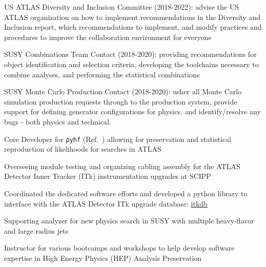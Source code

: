 \documentclass[margin,line]{resume}
\begin{document}
\begin{resume}
\begin{list2}
  \item US ATLAS Diversity and Inclusion Committee (2018-2022): advise the US ATLAS organization on how to implement recommendations in the Diversity and Inclusion report, which recommendations to implement, and modify practices and procedures to improve the collaboration environment for everyone
  \item SUSY Combinations Team Contact (2018-2020): providing recommendations for object identification and selection criteria, developing the toolchains necessary to combine analyses, and performing the statistical combinations
  \item SUSY Monte Carlo Production Contact (2018-2020): usher all Monte Carlo simulation production requests through to the production system, provide support for defining generator configurations for physics, and identify/resolve any bugs - both physics and technical.
  \item Core Developer for \texttt{pyhf} (Ref.~\cite{ATL-PHYS-PUB-2019-029}) allowing for preservation and statistical reproduction of likelihoods for searches in ATLAS
  \item Overseeing module testing and organizing cabling assembly for the ATLAS Detector Inner Tracker (ITk) instrumentation upgrades at SCIPP
  \item Coordinated the dedicated software efforts and developed a python library to interface with the ATLAS Detector ITk upgrade database: \href{https://pypi.org/project/itkdb/}{itkdb}
  \item Supporting analyzer for new physics search in SUSY with multiple heavy-flavor and large radius jets \cite{SUSY-2016-10, SUSY-2015-10, ATLAS-CONF-2017-021, ATLAS-CONF-2016-052, ATLAS-CONF-2015-067}
  \item Instructor for various bootcamps and workshops to help develop software expertise in High Energy Physics (HEP) Analysis Preservation~\cite{AwesomeFeb2020,USATLASBootcamp2019}
\end{list2}



\end{resume}
\end{document}
